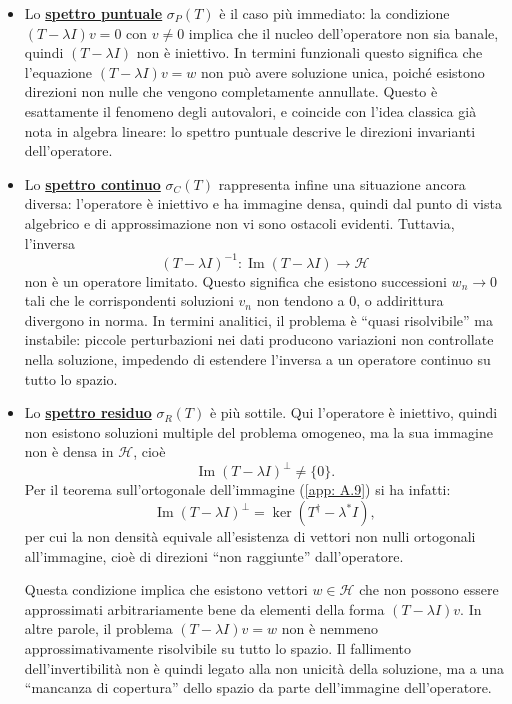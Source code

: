 \documentclass[a4paper,12pt]{report}
\begin{document}
\begin{itemize}
    

\item Lo \underline{\textbf{spettro puntuale}} $\sigma_P(T)$ è il caso più immediato: la condizione $(T-\lambda I)v=0$ con $v\neq 0$ implica che il nucleo dell’operatore non sia banale, quindi $(T-\lambda I)$ non è iniettivo. In termini funzionali questo significa che l’equazione $(T-\lambda I)v=w$ non può avere soluzione unica, poiché esistono direzioni non nulle che vengono completamente annullate. Questo è esattamente il fenomeno degli autovalori, e coincide con l’idea classica già nota in algebra lineare: lo spettro puntuale descrive le direzioni invarianti dell’operatore.

\item Lo \underline{\textbf{spettro continuo}} $\sigma_C(T)$ rappresenta infine una situazione ancora diversa: l’operatore è iniettivo e ha immagine densa, quindi dal punto di vista algebrico e di approssimazione non vi sono ostacoli evidenti. Tuttavia, l’inversa
\[
(T-\lambda I)^{-1} : \operatorname{Im}(T-\lambda I)\to \mathscr{H}
\]
non è un operatore limitato. Questo significa che esistono successioni $w_n \to 0$ tali che le corrispondenti soluzioni $v_n$ non tendono a $0$, o addirittura divergono in norma. In termini analitici, il problema è “quasi risolvibile” ma instabile: piccole perturbazioni nei dati producono variazioni non controllate nella soluzione, impedendo di estendere l’inversa a un operatore continuo su tutto lo spazio.

\item Lo \underline{\textbf{spettro residuo}} $\sigma_R(T)$ è più sottile. Qui l’operatore è iniettivo, quindi non esistono soluzioni multiple del problema omogeneo, ma la sua immagine non è densa in $\mathscr{H}$, cioè
\[
\operatorname{Im}(T-\lambda I)^\perp \neq \{0\}.
\]
Per il teorema sull’ortogonale dell’immagine (\ref{app: A.9}) si ha infatti:
\[
\operatorname{Im}(T-\lambda I)^\perp = \ker (T^\dagger - \lambda^* I),
\]
per cui la non densità equivale all’esistenza di vettori non nulli ortogonali all’immagine, cioè di direzioni “non raggiunte” dall’operatore.

Questa condizione implica che esistono vettori $w \in \mathscr{H}$ che non possono essere approssimati arbitrariamente bene da elementi della forma $(T-\lambda I)v$. In altre parole, il problema $(T-\lambda I)v=w$ non è nemmeno approssimativamente risolvibile su tutto lo spazio. Il fallimento dell’invertibilità non è quindi legato alla non unicità della soluzione, ma a una “mancanza di copertura” dello spazio da parte dell’immagine dell’operatore.

\end{itemize}
\end{document}
